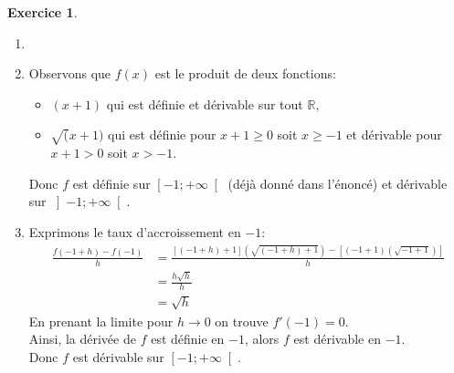 \documentclass{exam}
\theoremstyle{definition}
\newtheorem{exercice}{Exercice}
\begin{document}
\begin{exercice}
    \begin{enumerate}
        \item[]
        \item Observons que $f(x)$ est le produit de deux fonctions:
        \begin{itemize}
            \item $(x+1)$ qui est définie et dérivable sur tout $\mathbb{R}$,
            \item $\sqrt(x+1)$ qui est définie pour $x + 1 \geq 0$ soit $x \geq -1$ et dérivable pour $x + 1 > 0$ soit $x > -1$.
        \end{itemize}
        Donc $f$ est définie sur $\left[-1; +\infty\right[$ (déjà donné dans l'énoncé) et dérivable sur $\left]-1; +\infty\right[$.
        \item Exprimons le taux d'accroissement en $-1$:
        \begin{align*}
            \frac{f(-1+h) - f(-1)}{h} &= \frac{\left[(-1+h)+1\right]\left(\sqrt{(-1 + h) + 1}\right) - \left[(-1 + 1)(\sqrt{-1 + 1})\right]}{h}\\
            &= \frac{h\sqrt{h}}{h}\\
            &= \sqrt{h}
        \end{align*}
        En prenant la limite pour $h \rightarrow 0$ on trouve $f'(-1) = 0$.\\
        Ainsi, la dérivée de $f$ est définie en $-1$, alors $f$ est dérivable en $-1$.\\
        Donc $f$ est dérivable sur $\left[-1; +\infty\right[$.
    \end{enumerate}
\end{exercice}

    
\end{document}

